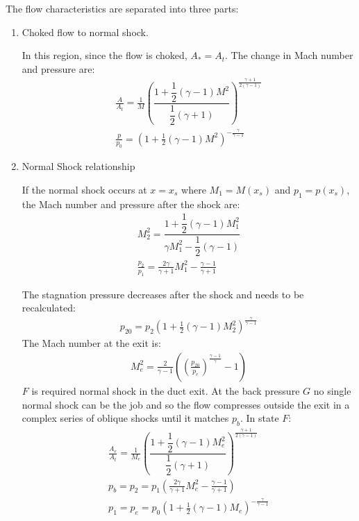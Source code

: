 The flow characteristics are separated into three parts:
\begin{enumerate}
    \item Choked flow to normal shock.

          In this region, since the flow is choked, $A_* = A_t$. The change in Mach number and pressure are:
          \begin{gather}
              \frac{A}{A_t} = \frac{1}{M}\left(\dfrac{1 + \dfrac{1}{2}\left(\gamma - 1\right)M^2}{\dfrac{1}{2}\left(\gamma + 1\right)}\right)^{\frac{\gamma + 1}{2\left(\gamma -1\right)}}\\[5pt]
              \frac{p}{p_0} = \left(1 + \frac{1}{2}\left(\gamma -1\right)M^2\right)^{-\frac{\gamma}{\gamma -1}}
          \end{gather}
    \item Normal Shock relationship

          If the normal shock occurs at $x = x_s$ where $M_1 = M(x_s)$ and $p_1 = p(x_s)$, the Mach number and pressure after the shock are:
          \begin{gather}
              M^2_2 = \dfrac{1 + \dfrac{1}{2}\left(\gamma - 1\right)M^2_1}{\gamma M^2_1 - \dfrac{1}{2}\left(\gamma - 1\right)}\\[5pt]
              \frac{p_2}{p_1} = \frac{2\gamma}{\gamma + 1}M^2_1 - \frac{\gamma -1}{\gamma + 1}
          \end{gather}

          The stagnation pressure decreases after the shock and needs to be recalculated:
          \begin{gather}
              p_{20} = p_2 \left(1 + \frac{1}{2}\left(\gamma - 1\right)M^2_2\right)^{\frac{\gamma }{\gamma -1}}
          \end{gather}
          The Mach number at the exit is:
          \begin{gather}
              M^2_e = \frac{2}{\gamma - 1}\left(\left(\frac{p_{20}}{p_e}\right)^{\frac{\gamma -1}{\gamma}}-1\right)
          \end{gather}
          $F$ is required normal shock in the duct exit. At the back pressure $G$ no single normal shock can be the job and so the flow compresses outside the exit in a complex series of oblique shocks until it matches $p_b$. In state $F$:
          \begin{gather}
              \frac{A_e}{A_t} = \frac{1}{M_e}\left(\dfrac{1+ \dfrac{1}{2}\left(\gamma -1\right)M^2_e}{\dfrac{1}{2}\left(\gamma + 1\right)}\right)^{\frac{\gamma + 1}{2\left(\gamma - 1\right)}}\\[5pt]
              p_b = p_2 = p_1 \left(\frac{2\gamma}{\gamma + 1}M^2_e-\frac{\gamma -1}{\gamma + 1}\right)\\[5pt]
              p_1 = p_e = p_0\left(1 + \frac{1}{2}\left(\gamma - 1\right)M_e\right)^{-\frac{\gamma}{\gamma -1}}
          \end{gather}
\end{enumerate}
